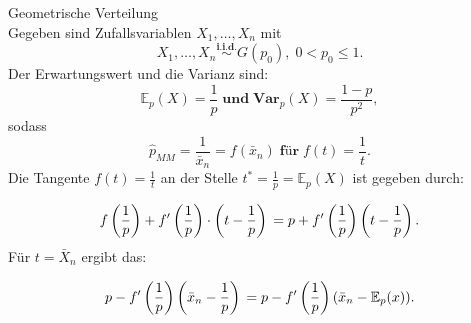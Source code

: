 \documentclass[10pt]{article}
\newcommand{\FZV}{X_1, \ldots, X_n} %
\newcommand{\EW}{\mathbb{E}} %
\newenvironment{BSP}[1][]
{\begin{Beispiel}[frametitle=#1]}{\end{Beispiel}}
\begin{document}
		\begin{BSP}[Beispiel 1.3.5 (Delta-Methode)]
		
		Geometrische Verteilung \\
		Gegeben sind Zufallsvariablen $\FZV$ mit
		\begin{equation*}
			\FZV \overset{\textbf{i.i.d.}}{\sim} G(p_0), \; 0 < p_0 \leq 1.
		\end{equation*} 
		Der Erwartungswert und die Varianz sind:
		\begin{equation*}
			\EW_p(X) = \frac{1}{p} \; \textbf{und} \;  \textbf{Var}_p(X) = \frac{1-p}{p^2},
		\end{equation*}
		sodass
		\begin{equation*}
			\hat{p}_{MM} = \frac{1}{\bar{x}_n} = f(\bar{x}_n) \; \textbf{für} \; f(t)= \frac{1}{t}.
		\end{equation*} 
		Die Tangente $f(t) = \frac{1}{t}$ an der Stelle $t^* = \frac{1}{p} = \EW_p(X)$ ist gegeben durch:
		
		\begin{equation*}
			f\left(\frac{1}{p}\right) + f'\left(\frac{1}{p}\right) \cdot \left(t-\frac{1}{p}\right)\\
			= p + f'\left(\frac{1}{p}\right) \left(t-\frac{1}{p}\right).
		\end{equation*}
		Für $t=\bar{X}_n$ ergibt das:
		
		\begin{equation*}
			p - f'\left(\frac{1}{p}\right) \left(\bar{x}_n - \frac{1}{p}\right) \\
			= p - f'\left(\frac{1}{p}\right) (\bar{x}_n - \EW_p(x)).
		\end{equation*}
		
	\end{BSP}
	
\end{document}
